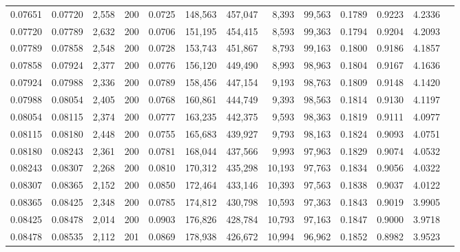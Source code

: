 \begin{tabular}{rrrrrrrrrrrrr}
0.07651 & 0.07720 & 2,558 & 200 &                                     0.0725 & 148,563 & 457,047 &   8,393 &  99,563 & 0.1789 & 0.9223 & 4.2336 \\
0.07720 & 0.07789 & 2,632 & 200 &                                     0.0706 & 151,195 & 454,415 &   8,593 &  99,363 & 0.1794 & 0.9204 & 4.2093 \\
0.07789 & 0.07858 & 2,548 & 200 &                                     0.0728 & 153,743 & 451,867 &   8,793 &  99,163 & 0.1800 & 0.9186 & 4.1857 \\
0.07858 & 0.07924 & 2,377 & 200 &                                     0.0776 & 156,120 & 449,490 &   8,993 &  98,963 & 0.1804 & 0.9167 & 4.1636 \\
0.07924 & 0.07988 & 2,336 & 200 &                                     0.0789 & 158,456 & 447,154 &   9,193 &  98,763 & 0.1809 & 0.9148 & 4.1420 \\
0.07988 & 0.08054 & 2,405 & 200 &                                     0.0768 & 160,861 & 444,749 &   9,393 &  98,563 & 0.1814 & 0.9130 & 4.1197 \\
0.08054 & 0.08115 & 2,374 & 200 &                                     0.0777 & 163,235 & 442,375 &   9,593 &  98,363 & 0.1819 & 0.9111 & 4.0977 \\
0.08115 & 0.08180 & 2,448 & 200 &                                     0.0755 & 165,683 & 439,927 &   9,793 &  98,163 & 0.1824 & 0.9093 & 4.0751 \\
0.08180 & 0.08243 & 2,361 & 200 &                                     0.0781 & 168,044 & 437,566 &   9,993 &  97,963 & 0.1829 & 0.9074 & 4.0532 \\
0.08243 & 0.08307 & 2,268 & 200 &                                     0.0810 & 170,312 & 435,298 &  10,193 &  97,763 & 0.1834 & 0.9056 & 4.0322 \\
0.08307 & 0.08365 & 2,152 & 200 &                                     0.0850 & 172,464 & 433,146 &  10,393 &  97,563 & 0.1838 & 0.9037 & 4.0122 \\
0.08365 & 0.08425 & 2,348 & 200 &                                     0.0785 & 174,812 & 430,798 &  10,593 &  97,363 & 0.1843 & 0.9019 & 3.9905 \\
0.08425 & 0.08478 & 2,014 & 200 &                                     0.0903 & 176,826 & 428,784 &  10,793 &  97,163 & 0.1847 & 0.9000 & 3.9718 \\
0.08478 & 0.08535 & 2,112 & 201 &                                     0.0869 & 178,938 & 426,672 &  10,994 &  96,962 & 0.1852 & 0.8982 & 3.9523 \\

\end{tabular}
